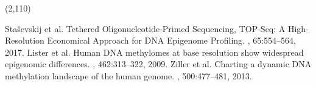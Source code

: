 \documentclass[a0,50pt]{a0poster}
\begin{document}
    \begin{textblock}{22}(2,110)
        \renewcommand{\section}[2]{}
        \begin{thebibliography}{}
                Staševskij et al.
                \newblock Tethered Oligonucleotide-Primed Sequencing, TOP-Seq: A High-Resolution Economical Approach for DNA Epigenome Profiling.
                , 65:554--564, 2017.
                Lister et al.
                \newblock Human DNA methylomes at base resolution show widespread epigenomic differences.
                , 462:313--322, 2009.
                Ziller et al.
                \newblock Charting a dynamic DNA methylation landscape of the human genome.
                , 500:477--481, 2013.

        \end{thebibliography}
    \end{textblock}
\end{document}
